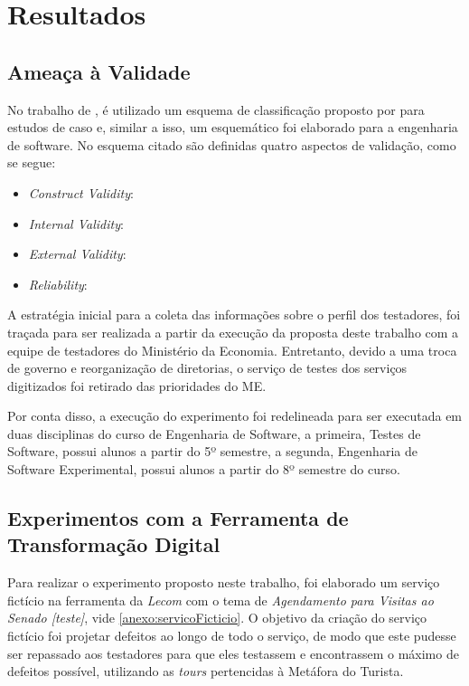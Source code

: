 \chapter{Resultados}
\label{ch:resultados}

\section{Ameaça à Validade}

No trabalho de \cite{wohlin2012experimentation}, é utilizado um esquema de classificação proposto por \cite{yin2017case} para estudos de caso e, similar a isso, um esquemático foi elaborado para a engenharia de software. No esquema citado são definidas quatro aspectos de validação, como se segue:

\begin{itemize}
    \item \textit{Construct Validity}: 
    \item \textit{Internal Validity}: 
    \item \textit{External Validity}: 
    \item \textit{Reliability}: 
\end{itemize}

A estratégia inicial para a coleta das informações sobre o perfil dos testadores, foi traçada para ser realizada a partir da execução da proposta deste trabalho com a equipe de testadores do Ministério da Economia. Entretanto, devido a uma troca de governo e reorganização de diretorias, o serviço de testes dos serviços digitizados foi retirado das prioridades do ME. 

Por conta disso, a execução do experimento foi redelineada para ser executada em duas disciplinas do curso de Engenharia de Software, a primeira, Testes de Software, possui alunos a partir do 5º semestre, a segunda, Engenharia de Software Experimental, possui alunos a partir do 8º semestre do curso.

\section{Experimentos com a Ferramenta de Transformação Digital}

Para realizar o experimento proposto neste trabalho, foi elaborado um serviço fictício na ferramenta da \textit{Lecom} com o tema de \textit{Agendamento para Visitas ao Senado [teste]}, vide \ref{anexo:servicoFicticio}. O objetivo da criação do serviço fictício foi projetar defeitos ao longo de todo o serviço, de modo que este pudesse ser repassado aos testadores para que eles testassem e encontrassem o máximo de defeitos possível, utilizando as \textit{tours} pertencidas à Metáfora do Turista.

